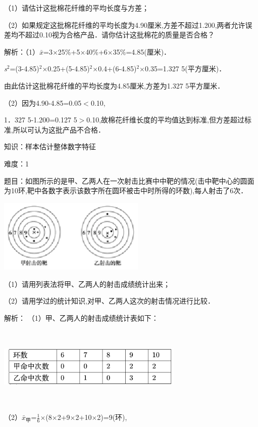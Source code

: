 \documentclass{article} %
\begin{document}
（1）请估计这批棉花纤维的平均长度与方差；

（2）如果规定这批棉花纤维的平均长度为4.90厘米,方差不超过1.200,两者允许误差均不超过0.10视为合格产品．请你估计这批棉花的质量是否合格？

解析：（1）$\bar{x}$=3$\mathrm{\times}$25\%+5$\mathrm{\times}$40\%+6$\mathrm{\times}$35\%=4.85(厘米)．

\textit{s}${}^{2}$=(3-4.85)${}^{2}$$\mathrm{\times}$0.25+(5-4.85)${}^{2}$$\mathrm{\times}$0.4+(6-4.85)${}^{2}$$\mathrm{\times}$0.35=1.327 5(平方厘米)．

由此估计这批棉花纤维的平均长度为4.85厘米,方差为1.327 5平方厘米．

（2）因为4.90-4.85=0.05$\mathrm{<}$0.10,

1．327 5-1.200=0.127 5$\mathrm{>}$0.10,故棉花纤维长度的平均值达到标准,但方差超过标准,所以可认为这批产品不合格．

知识：样本估计整体数字特征

难度：1

题目：如图所示的是甲、乙两人在一次射击比赛中中靶的情况(击中靶中心的圆面为10环,靶中各数字表示该数字所在圆环被击中时所得的环数),每人射击了6次．

\includegraphics*[width=2.76in, height=1.38in, keepaspectratio=false]{image94}

（1）请用列表法将甲、乙两人的射击成绩统计出来；

（2）请用学过的统计知识,对甲、乙两人这次的射击情况进行比较．

解析： （1）甲、乙两人的射击成绩统计表如下：

\includegraphics*[width=3.5in, height=1.5in, keepaspectratio=false]{image119}

（2）${\bar{x}}_{\textrm{甲}}$=$\frac{1}{6}\mathrm{\times}$(8$\mathrm{\times}$2+9$\mathrm{\times}$2+10$\mathrm{\times}$2)=9(环),
\end{document}

